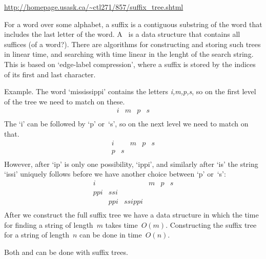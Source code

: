 \url{http://homepage.usask.ca/~ctl271/857/suffix_tree.shtml}

For a word over some alphabet, a suffix is a contiguous substring of
the word that includes the last letter of the
word. A~ is a data structure that contains all
suffices (of a word?). There are algorithms for constructing and
storing such trees in linear time, and searching with time linear in
the lenght of the search string. This is based on `edge-label
compression', where a suffix is stored by the indices of its first and
last character.

Example. The word `mississippi' contains the letters \emph{i,m,p,s},
so on the first level of the tree we need to match on these.
\[ 
\begin{array}{*{12}{c}}
i&m&p&s\\
\end{array}
\]
The `i' can be followed by `p' or~`s', so on the next level
we need to match on that.
\[ 
\begin{array}{*{12}{c}}
i& &m&p&s\\
p&s\\
\end{array}
\]
However, after `ip' is only one possibility, `ippi', 
and similarly after `is' the string `issi' uniquely
follows before we have another choice between `p' or~`s':
\[ 
\begin{array}{*{12}{c}}
i  &   &      &m&p&s\\
ppi&ssi\\
   &ppi&ssippi\\
\end{array}
\]
After we construct the full suffix tree we have a data structure
in which the time for finding a string of length~$m$ takes
time~$O(m)$.
Constructing the suffix tree for a string of length~$n$ 
can be done in time~$O(n)$.

Both 
 and  can
be done with suffix trees.

